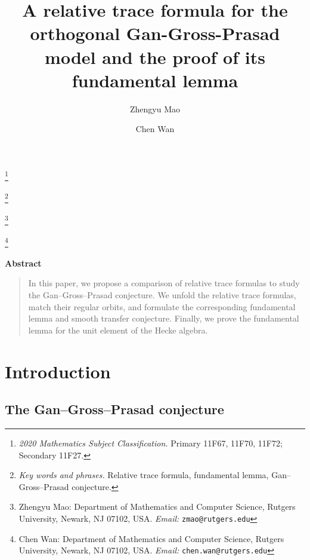 \documentclass[11pt,oneside,notitlepage]{book}
\title{\textbf{A relative trace formula for the orthogonal Gan-Gross-Prasad model and the proof of its fundamental lemma}}
\author{Zhengyu Mao \and Chen Wan}
\date{}
\numberwithin{equation}{section}
\theoremstyle{plain}
\theoremstyle{definition}
\newenvironment{abstract}
{\begin{center}\small\bfseries Abstract\end{center}\begin{quote}\small}
	{\end{quote}}
\newcommand{\blfootnote}[1]{%
	\begingroup\renewcommand{\thefootnote}{}\footnote{#1}%
	\addtocounter{footnote}{-1}\endgroup}
\begin{document}
\frontmatter
\maketitle

\blfootnote{\textit{2020 Mathematics Subject Classification.} Primary 11F67, 11F70, 11F72; Secondary 11F27.}
\blfootnote{\textit{Key words and phrases.} Relative trace formula, fundamental lemma, Gan--Gross--Prasad conjecture.}
\blfootnote{Zhengyu Mao: Department of Mathematics and Computer Science, Rutgers University, Newark, NJ 07102, USA. \textit{Email:} \texttt{zmao@rutgers.edu}}
\blfootnote{Chen Wan: Department of Mathematics and Computer Science, Rutgers University, Newark, NJ 07102, USA. \textit{Email:} \texttt{chen.wan@rutgers.edu}}



\begin{abstract}
In this paper, we propose a comparison of relative trace formulas to study the
Gan--Gross--Prasad conjecture. We unfold the relative trace formulas, match their regular orbits, and formulate the corresponding fundamental lemma and smooth transfer conjecture. Finally, we prove the fundamental lemma for the unit element of the Hecke algebra.
\end{abstract}

{\let\clearpage\relax\tableofcontents}




\mainmatter

\chapter{Introduction}


\section{The Gan--Gross--Prasad conjecture}
\end{document}
